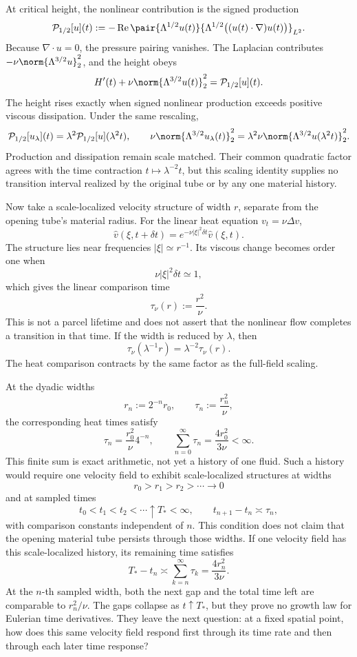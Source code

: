 
At critical height, the nonlinear contribution is the signed production
\[
  \mathcal P_{1/2}[u](t)
  :=
  -\operatorname{Re}
  \pair
    {\Lambda^{1/2}u(t)}
    {\Lambda^{1/2}\bigl((u(t)\cdot\nabla)u(t)\bigr)}_{L^2}.
\]
Because \(\nabla\cdot u=0\), the pressure pairing vanishes. The Laplacian contributes \(-\nu\norm{\Lambda^{3/2}u}_2^2\), and the height obeys
\[
  H'(t)
  +
  \nu\norm{\Lambda^{3/2}u(t)}_2^2
  =
  \mathcal P_{1/2}[u](t).
\]
The height rises exactly when signed nonlinear production exceeds positive viscous dissipation. Under the same rescaling,
\[
  \mathcal P_{1/2}[u_\lambda](t)
  =
  \lambda^2\mathcal P_{1/2}[u](\lambda^2t),
  \qquad
  \nu\norm{\Lambda^{3/2}u_\lambda(t)}_2^2
  =
  \lambda^2\nu\norm{\Lambda^{3/2}u(\lambda^2t)}_2^2.
\]
Production and dissipation remain scale matched. Their common quadratic factor agrees with the time contraction \(t\mapsto\lambda^{-2}t\), but this scaling identity supplies no transition interval realized by the original tube or by any one material history.


Now take a scale-localized velocity structure of width \(r\), separate from the opening tube's material radius. For the linear heat equation \(v_t=\nu\Delta v\),
\[
  \widehat v(\xi,t+\delta t)
  =
  e^{-\nu|\xi|^2\delta t}\widehat v(\xi,t).
\]
The structure lies near frequencies \(|\xi|\simeq r^{-1}\). Its viscous change becomes order one when
\[
  \nu|\xi|^2\delta t\simeq1,
\]
which gives the linear comparison time
\[
  \tau_\nu(r)
  :=
  \frac{r^2}{\nu}.
\]
This is not a parcel lifetime and does not assert that the nonlinear flow completes a transition in that time. If the width is reduced by \(\lambda\), then
\[
  \tau_\nu(\lambda^{-1}r)
  =
  \lambda^{-2}\tau_\nu(r).
\]
The heat comparison contracts by the same factor as the full-field scaling.


At the dyadic widths
\[
  r_n:=2^{-n}r_0,
  \qquad
  \tau_n:=\frac{r_n^2}{\nu},
\]
the corresponding heat times satisfy
\[
  \tau_n
  =
  \frac{r_0^2}{\nu}4^{-n},
  \qquad
  \sum_{n=0}^{\infty}\tau_n
  =
  \frac{4r_0^2}{3\nu}
  <
  \infty.
\]
This finite sum is exact arithmetic, not yet a history of one fluid. Such a history would require one \NavierStokes{} velocity field to exhibit scale-localized structures at widths
\[
  r_0>r_1>r_2>\cdots\longrightarrow0
\]
and at sampled times
\[
  t_0<t_1<t_2<\cdots\uparrow T_*<\infty,
  \qquad
  t_{n+1}-t_n\asymp\tau_n,
\]
with comparison constants independent of \(n\). This condition does not claim that the opening material tube persists through those widths. If one velocity field has this scale-localized history, its remaining time satisfies
\[
  T_*-t_n
  \asymp
  \sum_{k=n}^{\infty}\tau_k
  =
  \frac{4r_n^2}{3\nu}.
\]
At the \(n\)-th sampled width, both the next gap and the total time left are comparable to \(r_n^2/\nu\). The gaps collapse as \(t\uparrow T_*\), but they prove no growth law for Eulerian time derivatives. They leave the next question: at a fixed spatial point, how does this same velocity field respond first through its time rate and then through each later time response?
